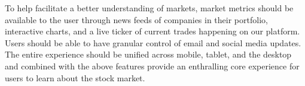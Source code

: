 To help facilitate a better understanding of markets, market metrics
should be available to the user through news feeds of companies in
their portfolio, interactive charts, and a live ticker of current
trades happening on our platform. Users should be able to have granular
control of email and social media updates.\\

The entire experience should be unified across mobile, tablet, and the
desktop and combined with the above features provide an enthralling
core experience for users to learn about the stock market.\\
